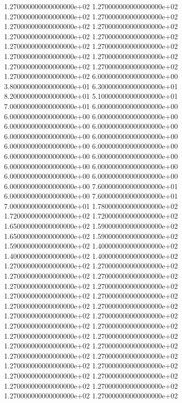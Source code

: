 1.270000000000000000e+02 1.270000000000000000e+02 1.270000000000000000e+02 1.270000000000000000e+02 1.270000000000000000e+02 1.270000000000000000e+02 1.270000000000000000e+02 1.270000000000000000e+02 1.270000000000000000e+02 1.270000000000000000e+02 1.270000000000000000e+02 1.270000000000000000e+02 1.270000000000000000e+02 1.270000000000000000e+02 1.270000000000000000e+02 6.000000000000000000e+00 3.800000000000000000e+01 6.300000000000000000e+01 8.200000000000000000e+01 5.100000000000000000e+01 7.000000000000000000e+01 6.000000000000000000e+00 6.000000000000000000e+00 6.000000000000000000e+00 6.000000000000000000e+00 6.000000000000000000e+00 6.000000000000000000e+00 6.000000000000000000e+00 6.000000000000000000e+00 6.000000000000000000e+00 6.000000000000000000e+00 6.000000000000000000e+00 6.000000000000000000e+00 6.000000000000000000e+00 6.000000000000000000e+00 6.000000000000000000e+00 6.000000000000000000e+00 7.600000000000000000e+01 6.000000000000000000e+00 7.600000000000000000e+01 7.000000000000000000e+01 1.780000000000000000e+02 1.720000000000000000e+02 1.720000000000000000e+02 1.650000000000000000e+02 1.590000000000000000e+02 1.650000000000000000e+02 1.590000000000000000e+02 1.590000000000000000e+02 1.400000000000000000e+02 1.400000000000000000e+02 1.400000000000000000e+02 1.270000000000000000e+02 1.270000000000000000e+02 1.270000000000000000e+02 1.270000000000000000e+02 1.270000000000000000e+02 1.270000000000000000e+02 1.270000000000000000e+02 1.270000000000000000e+02 1.270000000000000000e+02 1.270000000000000000e+02 1.270000000000000000e+02 1.270000000000000000e+02 1.270000000000000000e+02 1.270000000000000000e+02 1.270000000000000000e+02 1.270000000000000000e+02 1.270000000000000000e+02 1.270000000000000000e+02 1.270000000000000000e+02 1.270000000000000000e+02 1.270000000000000000e+02 1.270000000000000000e+02 1.270000000000000000e+02 1.270000000000000000e+02 1.270000000000000000e+02 1.270000000000000000e+02 1.270000000000000000e+02 1.270000000000000000e+02
